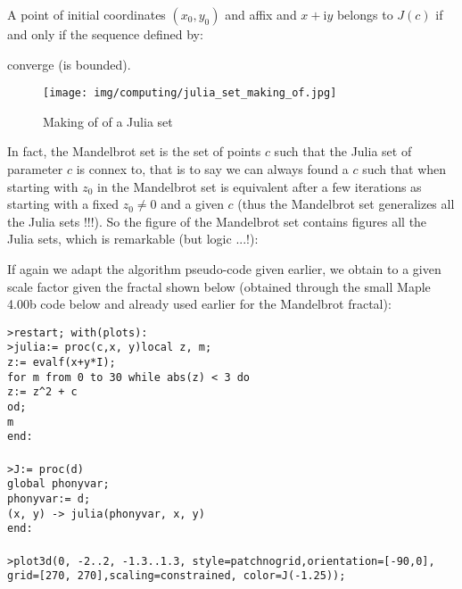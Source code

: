 	A point of initial coordinates $(x_0, y_0)$ and affix and $x + \mathrm{i}y$ belongs to $J(c)$ if and only if the sequence defined by:
	
	converge (is bounded).
	\begin{figure}[H]
		\centering
		\texttt{[image: img/computing/julia\_set\_making\_of.jpg]}
		\caption{Making of of a Julia set}
	\end{figure}
	In fact, the Mandelbrot set is the set of points $c$ such that the Julia set of parameter $c$ is connex to, that is to say we can always found a $c$ such that when starting with $z_0$ in the Mandelbrot set is equivalent after a few iterations as starting with a fixed $z_0\neq 0$ and a given $c$ (thus the Mandelbrot set generalizes all the Julia sets !!!). So the figure of the Mandelbrot set contains figures all the Julia sets, which is remarkable (but logic ...!):
	
	If again we adapt the algorithm pseudo-code given earlier, we obtain to a given scale factor given the fractal shown below (obtained through the small Maple 4.00b code below and already used earlier for the Mandelbrot fractal):
	
	\texttt{>restart; with(plots):\\
	>julia:= proc(c,x, y)local z, m;\\
	z:= evalf(x+y*I);\\
	for m from 0 to 30 while abs(z) < 3 do\\
	   z:= z\string^2 + c\\
	   od;\\
	   m\\
	end:\\\\
	>J:= proc(d)\\
	global phonyvar;\\
	phonyvar:= d;\\
	(x, y) -> julia(phonyvar, x, y)\\
	end:\\\\
	>plot3d(0, -2..2, -1.3..1.3, style=patchnogrid,orientation=[-90,0], grid=[270, 270],scaling=constrained, color=J(-1.25));\\}
	
